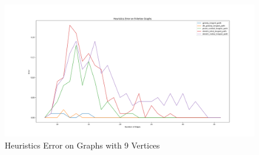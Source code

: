 \documentclass[twocolumn,showpacs,%
  nofootinbib,aps,superscriptaddress,%
  eqsecnum,prd,notitlepage,showkeys,11pt]{article}
\begin{document}
\begin{figure}[htp]
    \centering
    \includegraphics[width=\linewidth]{Error9VertexAll.png}
    \caption{Heuristics Error on Graphs with 9 Vertices}
    \label{fig:Error}
\end{figure}
\end{document}
